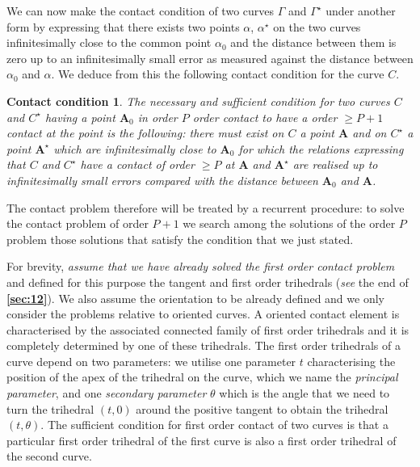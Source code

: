 \documentclass[leqno,11pt]{book}
\numberwithin{equation}{chapter}
\theoremstyle{shape1}
\theoremstyle{shapesmall}
\newcommand{\fsref}[1]{{\rm\textsection\textbf{\ref{sec:#1}}}}
\newcommand{\str}{^{\star}}
\begin{document}
We can now make the contact condition of two curves $\Gamma$ and $\Gamma\str$ under another form by expressing that there exists two points $\alpha$, $\alpha\str$ on the two curves infinitesimally close to the common point $\alpha_{0}$ and the distance between them is zero up to an infinitesimally small error as measured against the distance between $\alpha_{0}$ and $\alpha$. We deduce from this the following contact condition for the curve $C$.
\theoremstyle{shapesc}
\newtheorem*{contactcon}{Contact condition}
\begin{contactcon}
  The necessary and sufficient condition for two curves $C$ and $C\str$ having a point $\mathbf{A}_{0}$ in order $P$ order contact to have a order $\ge P+1$ contact at the point is the following: there must exist on $C$ a point $\mathbf{A}$ and on $C\str$ a point $\mathbf{A}\str$ which are infinitesimally close to $\mathbf{A}_{0}$ for which the relations expressing that $C$ and $C\str$ have a contact of order $\ge P$ at $\mathbf{A}$ and $\mathbf{A}\str$ are realised up to infinitesimally small errors compared with the distance between $\mathbf{A}_{0}$ and $\mathbf{A}$.
\end{contactcon}

The contact problem therefore will be treated by a recurrent procedure: to solve the contact problem of order $P+1$ we search among the solutions of the order $P$ problem those solutions that satisfy the condition that we just stated.

For brevity, \emph{assume that we have already solved the first order contact problem} and defined for this purpose the tangent and first order trihedrals (\emph{see} the end of \fsref{12}). We also assume the orientation to be already defined and we only consider the problems relative to oriented curves. A oriented contact element is characterised by the associated connected family of first order trihedrals and it is completely determined by one of these trihedrals. The first order trihedrals of a curve depend on two parameters: we utilise one parameter $t$ characterising the position of the apex of the trihedral on the curve, which we name the \emph{principal parameter}, and one \emph{secondary parameter} $\theta$ which is the angle that we need to turn the trihedral $(t,0)$ around the positive tangent to obtain the trihedral $(t,\theta)$. The sufficient condition for first order contact of two curves is that a particular first order trihedral of the first curve is also a first order trihedral of the second curve.
\end{document}
